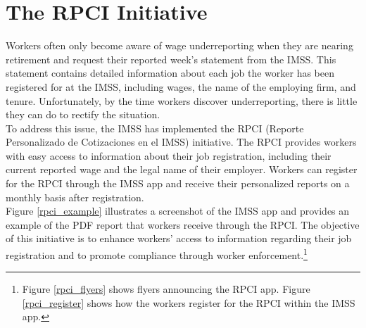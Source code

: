 \documentclass[10pt, oneside]{book}
\begin{document}
\section{The RPCI Initiative}

Workers often only become aware of wage underreporting when they are nearing retirement and request their reported week's statement from the IMSS. This statement contains detailed information about each job the worker has been registered for at the IMSS, including wages, the name of the employing firm, and tenure. Unfortunately, by the time workers discover underreporting, there is little they can do to rectify the situation. \\ 

To address this issue, the IMSS has implemented the RPCI (Reporte Personalizado de Cotizaciones en el IMSS) initiative. The RPCI provides workers with easy access to information about their job registration, including their current reported wage and the legal name of their employer. Workers can register for the RPCI through the IMSS app and receive their personalized reports on a monthly basis after registration. \\

Figure \ref{rpci_example} illustrates a screenshot of the IMSS app and provides an example of the PDF report that workers receive through the RPCI. The objective of this initiative is to enhance workers' access to information regarding their job registration and to promote compliance through worker enforcement.\footnote{Figure \ref{rpci_flyers} shows flyers announcing the RPCI app. Figure \ref{rpci_register} shows how the workers register for the RPCI within the IMSS app.} \\ 
\end{document}
